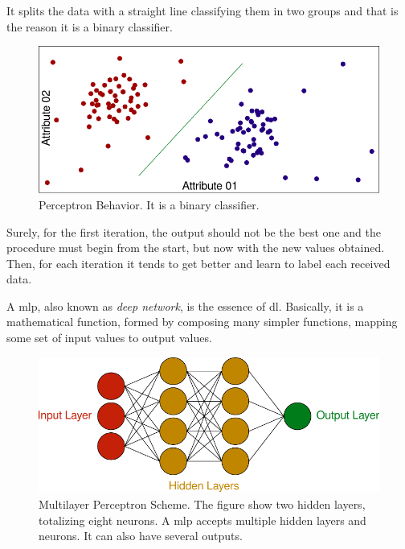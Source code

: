 It splits the data with a straight line classifying them in two groups and that is the reason it is a binary classifier.

\begin{figure}[!htb]
    \centering
    \includegraphics{figures/2review/nn/perceptron_charge.pdf}
    \caption[Perceptron Behavior]{Perceptron Behavior. It is a binary classifier.}
\end{figure}

Surely, for the first iteration, the output should not be the best one and the procedure must begin from the start, but now with the new values obtained. Then, for each iteration it tends to get better and learn to label each received data.
 
A \gls*{mlp}, also known as \emph{deep network}, is the essence of \gls*{dl}. Basically, it is a mathematical function, formed by composing many simpler functions, mapping some set of input values to output values.
%
\begin{figure}[!htb]
    \centering
    \includegraphics{figures/2review/nn/mlp.pdf}
    \caption[Multilayer Perceptron Scheme]{Multilayer Perceptron Scheme. The figure show two hidden layers, totalizing eight neurons. A \gls*{mlp} accepts multiple hidden layers and neurons. It can also have several outputs.}
\end{figure}